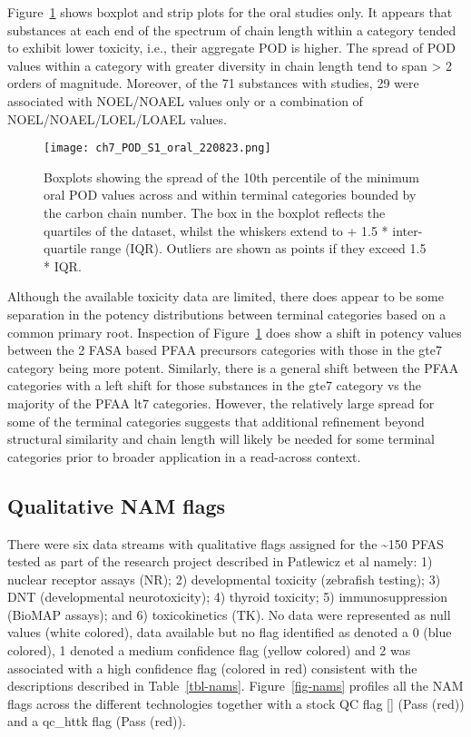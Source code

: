\documentclass[
  super,
  preprint,
  3p]{elsarticle}
\begin{document}
Figure~\ref{fig-pods-oral} shows boxplot and strip plots for the oral
studies only. It appears that substances at each end of the spectrum of
chain length within a category tended to exhibit lower toxicity, i.e.,
their aggregate POD is higher. The spread of POD values within a
category with greater diversity in chain length tend to span
\textgreater{} 2 orders of magnitude. Moreover, of the 71 substances
with studies, 29 were associated with NOEL/NOAEL values only or a
combination of NOEL/NOAEL/LOEL/LOAEL values.

\begin{figure}

{\centering \texttt{[image: ch7\_POD\_S1\_oral\_220823.png]}

}

\caption{\label{fig-pods-oral}Boxplots showing the spread of the 10th
percentile of the minimum oral POD values across and within terminal
categories bounded by the carbon chain number. The box in the boxplot
reflects the quartiles of the dataset, whilst the whiskers extend to +
1.5 * inter-quartile range (IQR). Outliers are shown as points if they
exceed 1.5 * IQR.}

\end{figure}

Although the available toxicity data are limited, there does appear to
be some separation in the potency distributions between terminal
categories based on a common primary root. Inspection of
Figure~\ref{fig-pods-oral} does show a shift in potency values between
the 2 FASA based PFAA precursors categories with those in the gte7
category being more potent. Similarly, there is a general shift between
the PFAA categories with a left shift for those substances in the gte7
category vs the majority of the PFAA lt7 categories. However, the
relatively large spread for some of the terminal categories suggests
that additional refinement beyond structural similarity and chain length
will likely be needed for some terminal categories prior to broader
application in a read-across context.

\hypertarget{qualitative-nam-flags}{%
\subsection{Qualitative NAM flags}\label{qualitative-nam-flags}}

There were six data streams with qualitative flags assigned for the
\textasciitilde150 PFAS tested as part of the research project described
in Patlewicz et al \citep{patlewicz_towards_2022} namely: 1) nuclear
receptor assays (NR); 2) developmental toxicity (zebrafish testing); 3)
DNT (developmental neurotoxicity); 4) thyroid toxicity; 5)
immunosuppression (BioMAP assays); and 6) toxicokinetics (TK). No data
were represented as null values (white colored), data available but no
flag identified as denoted a 0 (blue colored), 1 denoted a medium
confidence flag (yellow colored) and 2 was associated with a high
confidence flag (colored in red) consistent with the descriptions
described in Table~\ref{tbl-nams}. Figure~\ref{fig-nams} profiles all
the NAM flags across the different technologies together with a stock QC
flag {[}\citet{smeltz_targeted_2023}{]} (Pass (red)) and a qc\_httk flag
(Pass (red)).
\end{document}
